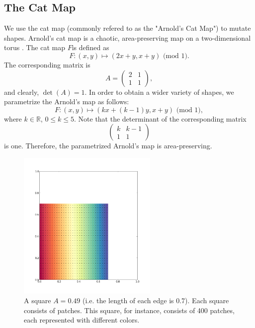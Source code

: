 \documentclass[12pt]{article}
\begin{document}
\subsection{The Cat Map}
We use the cat map (commonly refered to as the "Arnold's Cat Map") to mutate shapes.
Arnold's cat map is a chaotic, area-preserving map on a two-dimensional torus \citep{hilborn}.
The cat map $F$is defined as
\begin{equation*}
  F: (x,y) \mapsto (2x + y, x + y) \mbox{ (mod 1)}.
\end{equation*}
The corresponding matrix is
\begin{equation*}
A =
\begin{pmatrix}
    2 & 1  \\
    1 & 1  
  \end{pmatrix},
\end{equation*}
and clearly, $\det(A) = 1$.
In order to obtain a wider variety of shapes, we parametrize the Arnold's map as follows:
\begin{equation*}
  F: (x,y) \mapsto (kx + (k-1)y, x + y) \mbox{ (mod 1)},
\end{equation*}
where $k \in \mathbb{R}$, $0 \leq k \leq 5$.
Note that the determinant of the corresponding matrix
\begin{equation*}
\begin{pmatrix}
    k & k-1  \\
    1 & 1  
  \end{pmatrix}
\end{equation*}
is one.
Therefore, the parametrized Arnold's map is area-preserving.
\begin{figure}[t]
  \centering
  \includegraphics[width=0.6\textwidth]{square_049_900}
  \caption{A square $A = 0.49$ (i.e. the length of each edge is 0.7). Each square consists of patches. This square, for instance, consists of 400 patches, each represented with different colors.}
  \label{fig:square}
\end{figure}
\end{document}
